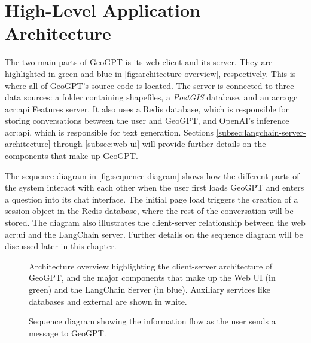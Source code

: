 \section{High-Level Application Architecture}
\label{sec:high-level-application-architecture}

The two main parts of GeoGPT is its web client and its server. They are highlighted in green and blue in \autoref{fig:architecture-overview}, respectively. This is where all of GeoGPT's source code is located. The server is connected to three data sources: a folder containing shapefiles, a \textit{PostGIS} database, and an \acrshort{acr:ogc} \acrshort{acr:api} Features server. It also uses a Redis database, which is responsible for storing conversations between the user and GeoGPT, and OpenAI's inference \acrshort{acr:api}, which is responsible for text generation. Sections \ref{subsec:langchain-server-architecture} through \ref{subsec:web-ui} will provide further details on the components that make up GeoGPT.

The sequence diagram in \autoref{fig:sequence-diagram} shows how the different parts of the system interact with each other when the user first loads GeoGPT and enters a question into its chat interface. The initial page load triggers the creation of a session object in the Redis database, where the rest of the conversation will be stored. The diagram also illustrates the client-server relationship between the web \acrshort{acr:ui} and the LangChain server. Further details on the sequence diagram will be discussed later in this chapter.

\begin{figure}
    \centering
    \caption[Architecture overview for GeoGPT]{Architecture overview highlighting the client-server architecture of GeoGPT, and the major components that make up the Web UI (in green) and the LangChain Server (in blue). Auxiliary services like databases and external  are shown in white.}
    \label{fig:architecture-overview}
\end{figure}

\begin{figure}
    \caption[Sequence diagram for GeoGPT]{Sequence diagram showing the information flow as the user sends a message to GeoGPT.}
    \label{fig:sequence-diagram}
\end{figure}



